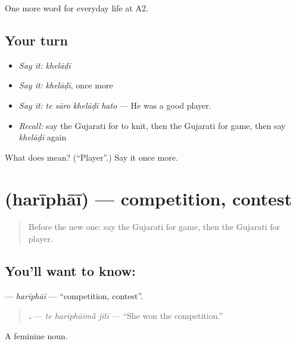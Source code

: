 \begin{grammarlens}[title={What you've built}]
One more word for everyday life at A2.
\end{grammarlens}

\subsection*{Your turn}
\begin{itemize}
\raggedright
  \item \emph{Say it:} \emph{khelāḍī}
  \item \emph{Say it:} \emph{khelāḍī}, once more
  \item \emph{Say it:} \emph{te sāro khelāḍī hato} — He was a good player.
  \item \emph{Recall:} say the Gujarati for to knit, then the Gujarati for game, then say \emph{khelāḍī} again
\end{itemize}

\begin{tcolorbox}[breakable,colback=teal!4,colframe=teal!35!black,title={Before you move on}]
What does  mean? (\textquotedblleft{}Player\textquotedblright{}.) Say it once more.
\end{tcolorbox}
\section[\texorpdfstring{\gu{હરીફાઈ} (harīphāī)}{હરીફાઈ (harīphāī)}]{ (harīphāī) — competition, contest}

\label{lesson:GU-C257-hariphai}



\begin{quote}
Before the new one: say the Gujarati for game, then the Gujarati for player.
\end{quote}

\subsection*{You'll want to know: }
\textbf{} — \emph{harīphāī} — \textquotedblleft{}competition, contest\textquotedblright{}.

\begin{quote}
\textbf{  .} — \emph{te harīphāīmā̃ jītī} — \textquotedblleft{}She won the competition.\textquotedblright{}
\end{quote}

A feminine noun.

